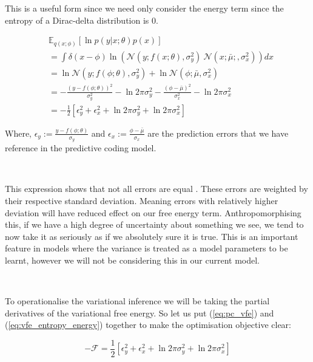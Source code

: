 \documentclass{article}
\newcommand{\refp}[1]{(\ref{#1})}
\begin{document}
This is a useful form since we need only consider the energy term since the entropy of a Dirac-delta distribution is 0.

\begin{equation}\label{eq:pc_vfe}
	\begin{aligned}
	& \mathbb{E}_{q(x ; \phi)} \left[ 	\ln p(y | x ; \theta) p(x) \right] \\
	&= \int \delta(x - \phi) \ln \left( \mathcal{N}(y ; f(x; \theta), \sigma^2_y) \ \mathcal{N}(x; \bar{\mu};, \sigma^2_x) \right) dx \\
		&= \ln \mathcal{N}(y; f(\phi; \theta), \sigma^2_y) + \ln \mathcal{N}(\phi; \bar{\mu}, \sigma^2_x) \\
		&= - \frac{(y - f(\phi; \theta))^2}{\sigma^2_y} - \ln 2 \pi \sigma^2_y - \frac{(\phi - \bar{\mu})^2}{\sigma^2_x} - \ln 2 \pi \sigma^2_x \\
		&= - \frac{1}{2}\left[ \epsilon_y^2 + \epsilon_x^2 +\ln 2 \pi \sigma^2_y +\ln 2 \pi \sigma^2_x  \right]
	\end{aligned}
\end{equation}

Where, $\epsilon_y := \frac{y - f(\phi; \theta)}{\sigma_y}$ and $\epsilon_x := \frac{\phi - \bar{\mu}}{\sigma_x}$ are the prediction errors that we have reference in the predictive coding model. 

\

This expression shows that not all errors are equal \citep{hodson2023empirical}. These errors are weighted by their respective standard deviation. Meaning errors with relatively higher deviation will have reduced effect on our free energy term. Anthropomorphising this, if we have a high degree of uncertainty about something we see, we tend to now take it as seriously as if we absolutely sure it is true. This is an important feature in models where the variance is treated as a model parameters to be learnt, \citep{bogacz2017tutorial, friston2003learning} however we will not be considering this in our current model.

\

To operationalise the variational inference we will be taking the partial derivatives of the variational free energy. So let us put \refp{eq:pc_vfe} and \refp{eq:vfe_entropy_energy} together to make the optimisation objective clear:

\begin{equation}\label{eq:vfe_pc}
	-\mathcal{F} = \frac{1}{2}\left[ \epsilon_y^2 + \epsilon_x^2 +\ln 2 \pi \sigma^2_y +\ln 2 \pi \sigma^2_x  \right]
\end{equation}
\end{document}
